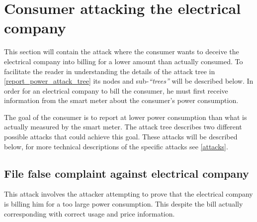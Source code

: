 
\section{Consumer attacking the electrical company}\label{attacks:consumer_vs_electrical}
This section will contain the attack where the consumer wants to deceive the electrical company into billing for a lower amount than actually consumed.
To facilitate the reader in understanding the details of the attack tree in \cref{report_power_attack_tree} its nodes and sub-\emph{``trees''} will be described below.
In order for an electrical company to bill the consumer, he must first receive information from the smart meter about the consumer's power consumption.

The goal of the consumer is to report at lower power consumption than what is actually measured by the smart meter.
The attack tree describes two different possible attacks that could achieve this goal.
These attacks will be described below, for more technical descriptions of the specific attacks see \cref{attacks}.



\subsection{File false complaint against electrical company}
This attack involves the attacker attempting to prove that the electrical company is billing him for a too large power consumption.
This despite the bill actually corresponding with correct usage and price information.

